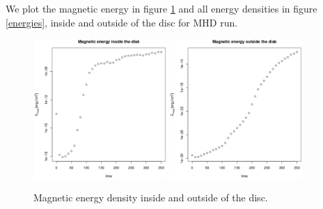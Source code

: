 \documentclass[a4paper,12pt]{article}
\begin{document}
We plot the magnetic energy in figure \ref{enmag} and all energy densities in figure \ref{energies},
inside and outside of the disc for MHD run.

\begin{figure}[!ht]
 \begin{center}
  \includegraphics[width=0.45\textwidth]{figs/em_vs_t_disco.eps}
  \includegraphics[width=0.45\textwidth]{figs/em_vs_t_outside.eps}
  \caption{Magnetic energy density inside and outside of the disc.}

 \label{enmag}
 \end{center}
\end{figure}
\end{document}
